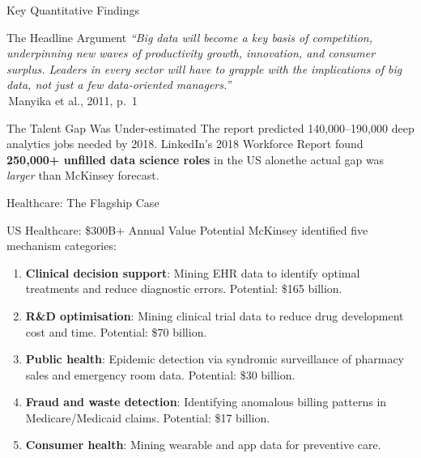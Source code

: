 \documentclass[aspectratio=169,10pt]{beamer}
\begin{document}
\begin{frame}{Key Quantitative Findings}
  
      \begin{alertblock}{The Headline Argument}
        \textit{``Big data will become a key basis of competition, underpinning new waves of productivity growth, innovation, and consumer surplus.  Leaders in every sector will have to grapple with the implications of big data, not just a few data-oriented managers.''}\\
        \hfill\textemdash\,Manyika et al., 2011, p.\ 1
      \end{alertblock}
      \vspace{6pt}
      \begin{exampleblock}{The Talent Gap Was Under-estimated}
        \small The report predicted 140{,}000--190{,}000 deep analytics jobs needed by 2018.  LinkedIn's 2018 Workforce Report found \textbf{250{,}000+ unfilled data science roles} in the US alone\textemdash the actual gap was \emph{larger} than McKinsey forecast.
      \end{exampleblock} 
\end{frame}
\begin{frame}{Healthcare: The Flagship Case} 
      \begin{block}{US Healthcare: \$300B+ Annual Value Potential}
        McKinsey identified five mechanism categories:
        \vspace{4pt}
        \begin{enumerate}
          \item \textbf{Clinical decision support}: Mining EHR data to identify optimal treatments and reduce diagnostic errors. Potential: \$165 billion.
          \item \textbf{R\&D optimisation}: Mining clinical trial data to reduce drug development cost and time.  Potential: \$70 billion.
          \item \textbf{Public health}: Epidemic detection via syndromic surveillance of pharmacy sales and emergency room data.  Potential: \$30 billion.
          \item \textbf{Fraud and waste detection}: Identifying anomalous billing patterns in Medicare/Medicaid claims.  Potential: \$17 billion.
          \item \textbf{Consumer health}: Mining wearable and app data for preventive care.
        \end{enumerate}
      \end{block}

     
\end{frame}
\end{document}
